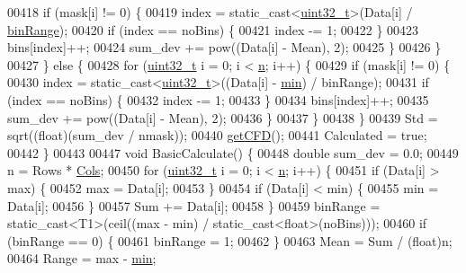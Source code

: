 \begin{DoxyCode}
00418         \textcolor{keywordflow}{if} (mask[i] != 0) \{
00419           index = \textcolor{keyword}{static\_cast<}\hyperlink{_soil_math_types_8h_a435d1572bf3f880d55459d9805097f62}{uint32\_t}\textcolor{keyword}{>}(Data[i] / \hyperlink{class_soil_math_1_1_stats_a00be1d2a705a8aba532fbe726001bbb2}{binRange});
00420           \textcolor{keywordflow}{if} (index == noBins) \{
00421             index -= 1;
00422           \}
00423           bins[index]++;
00424           sum\_dev += pow((Data[i] - Mean), 2);
00425         \}
00426       \}
00427     \} \textcolor{keywordflow}{else} \{
00428       \textcolor{keywordflow}{for} (\hyperlink{_soil_math_types_8h_a435d1572bf3f880d55459d9805097f62}{uint32\_t} i = 0; i < \hyperlink{class_soil_math_1_1_stats_a7bc57af334b68253832ebac17f85d091}{n}; i++) \{
00429         \textcolor{keywordflow}{if} (mask[i] != 0) \{
00430           index = \textcolor{keyword}{static\_cast<}\hyperlink{_soil_math_types_8h_a435d1572bf3f880d55459d9805097f62}{uint32\_t}\textcolor{keyword}{>}((Data[i] - \hyperlink{class_soil_math_1_1_stats_aa44c07a23b1c2ce0f0407e7cee4f39a9}{min}) / binRange);
00431           \textcolor{keywordflow}{if} (index == noBins) \{
00432             index -= 1;
00433           \}
00434           bins[index]++;
00435           sum\_dev += pow((Data[i] - Mean), 2);
00436         \}
00437       \}
00438     \}
00439     Std = sqrt((\textcolor{keywordtype}{float})(sum\_dev / nmask));
00440     \hyperlink{class_soil_math_1_1_stats_a5508190fbea17bfec505ff8c47b1a45e}{getCFD}();
00441     Calculated = \textcolor{keyword}{true};
00442   \}
00443 
00447   \textcolor{keywordtype}{void} BasicCalculate() \{
00448     \textcolor{keywordtype}{double} sum\_dev = 0.0;
00449     n = Rows * \hyperlink{class_soil_math_1_1_stats_a971f1ec23c32137805c4577f05454d83}{Cols};
00450     \textcolor{keywordflow}{for} (\hyperlink{_soil_math_types_8h_a435d1572bf3f880d55459d9805097f62}{uint32\_t} i = 0; i < \hyperlink{class_soil_math_1_1_stats_a7bc57af334b68253832ebac17f85d091}{n}; i++) \{
00451       \textcolor{keywordflow}{if} (Data[i] > max) \{
00452         max = Data[i];
00453       \}
00454       \textcolor{keywordflow}{if} (Data[i] < min) \{
00455         min = Data[i];
00456       \}
00457       Sum += Data[i];
00458     \}
00459     binRange = \textcolor{keyword}{static\_cast<}T1\textcolor{keyword}{>}(ceil((max - min) / static\_cast<float>(noBins)));
00460     \textcolor{keywordflow}{if} (binRange == 0) \{
00461       binRange = 1;
00462     \}
00463     Mean = Sum / (float)n;
00464     Range = max - \hyperlink{class_soil_math_1_1_stats_aa44c07a23b1c2ce0f0407e7cee4f39a9}{min};

\end{DoxyCode}
